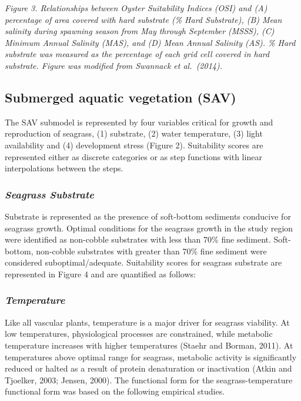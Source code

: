 \documentclass[
]{book}
\begin{document}
\emph{Figure 3. Relationships between Oyster Suitability Indices (OSI) and (A) percentage of area covered with hard substrate (\% Hard Substrate), (B) Mean salinity during spawning season from May through September (MSSS), (C) Minimum Annual Salinity (MAS), and (D) Mean Annual Salinity (AS). \% Hard substrate was measured as the percentage of each grid cell covered in hard substrate. Figure was modified from Swannack et al.~(2014).}

\hypertarget{submerged-aquatic-vegetation-sav}{%
\subsection{Submerged aquatic vegetation (SAV)}\label{submerged-aquatic-vegetation-sav}}

The SAV submodel is represented by four variables critical for growth and reproduction of seagrass, (1) substrate, (2) water temperature, (3) light availability and (4) development stress (Figure 2). Suitability scores are represented either as discrete categories or as step functions with linear interpolations between the steps.

\hypertarget{seagrass-substrate}{%
\subsubsection{\texorpdfstring{\emph{Seagrass Substrate}}{Seagrass Substrate}}\label{seagrass-substrate}}

Substrate is represented as the presence of soft-bottom sediments conducive for seagrass growth. Optimal conditions for the seagrass growth in the study region were identified as non-cobble substrates with less than 70\% fine sediment. Soft-bottom, non-cobble substrates with greater than 70\% fine sediment were considered suboptimal/adequate. Suitability scores for seagrass substrate are represented in Figure 4 and are quantified as follows:

\hypertarget{temperature}{%
\subsubsection{\texorpdfstring{\emph{Temperature}}{Temperature}}\label{temperature}}

Like all vascular plants, temperature is a major driver for seagrass viability. At low temperatures, physiological processes are constrained, while metabolic temperature increases with higher temperatures (Staehr and Borman, 2011). At temperatures above optimal range for seagrass, metabolic activity is significantly reduced or halted as a result of protein denaturation or inactivation (Atkin and Tjoelker, 2003; Jensen, 2000). The functional form for the seagrass-temperature functional form was based on the following empirical studies.
\end{document}
